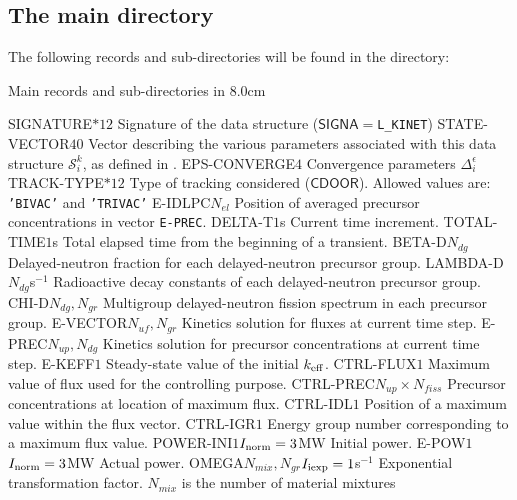 \subsection{The main  directory}\label{sect:kinetdirmain}

The following records and sub-directories will be found in the  directory:

\begin{DescriptionEnregistrement}{Main records and sub-directories in }{8.0cm}

\CharEnr
  {SIGNATURE}{$*12$}
  {Signature of the data structure ($\mathsf{SIGNA}=${\tt L\_KINET})}
\IntEnr
  {STATE-VECTOR}{$40$}
  {Vector describing the various parameters associated with this data structure $\mathcal{S}^{k}_{i}$,
  as defined in .}
\RealEnr
  {EPS-CONVERGE}{$4$}{}
  {Convergence parameters $\Delta_i^\epsilon$}
\CharEnr
  {TRACK-TYPE}{$*12$}
  {Type of tracking considered ($\mathsf{CDOOR}$). Allowed values are:
  {\tt 'BIVAC'} and {\tt 'TRIVAC'}}
\IntEnr
  {E-IDLPC}{$N_{el}$}
  {Position of averaged precursor concentrations in vector {\tt E-PREC}.}
\RealEnr
  {DELTA-T}{$1$}{s}
  {Current time increment.}
\RealEnr
  {TOTAL-TIME}{$1$}{s}
  {Total elapsed time from the beginning of a transient.}
\RealEnr
  {BETA-D}{$N_{dg}$}{}
  {Delayed-neutron fraction for each delayed-neutron precursor group.}
\RealEnr
  {LAMBDA-D}{$N_{dg}$}{s$^{-1}$}
  {Radioactive decay constants of each delayed-neutron precursor group.}
\RealEnr
  {CHI-D}{$N_{dg},N_{gr}$}{}
  {Multigroup delayed-neutron fission spectrum in each precursor group.}
\RealEnr
  {E-VECTOR}{$N_{uf},N_{gr}$}{}
  {Kinetics solution for fluxes at current time step.}
\RealEnr
  {E-PREC}{$N_{up},N_{dg}$}{}
  {Kinetics solution for precursor concentrations at current time step.}
\RealEnr
  {E-KEFF}{$1$}{}
  {Steady-state value of the initial $k_{\rm eff}$.}
\RealEnr
  {CTRL-FLUX}{$1$}{}
  {Maximum value of flux used for the controlling purpose.}
\RealEnr
  {CTRL-PREC}{$N_{up}\times N_{fiss}$}{}
  {Precursor concentrations at location of maximum flux.}
\IntEnr
  {CTRL-IDL}{$1$}
  {Position of a maximum value within the flux vector.}
\IntEnr
  {CTRL-IGR}{$1$}
  {Energy group number corresponding to a maximum flux value.}
\OptRealEnr
  {POWER-INI}{$1$}{$I_{\rm norm}=3$}{MW}
  {Initial power.}
\OptRealEnr
  {E-POW}{$1$}{$I_{\rm norm}=3$}{MW}
  {Actual power.}
\OptRealEnr
  {OMEGA}{$N_{mix},N_{gr}$}{$I_{\rm iexp}=1$}{s$^{-1}$}
  {Exponential transformation factor. $N_{mix}$ is the number of material mixtures}
\end{DescriptionEnregistrement}

